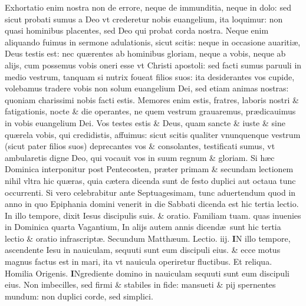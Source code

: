 \documentclass[a5paper,10pt]{book}
\def\rightmarginnote{%
	\lrmarginnote{\hskip\columnwidth \hskip -1em}}
\def\ae{æ}
\begin{document}
\begin{multicols*}{2}
Exhortatio enim nostra non de errore, neque de immunditia, neque in dolo: sed sicut probati sumus a Deo vt crederetur nobis euangelium, ita loquimur: non quasi hominibus placentes, sed Deo qui probat corda nostra.
Neque enim aliquando fuimus in sermone adulationis, sicut scitis: neque in occasione auariti\ae , Deus testis est: nec qu\ae rentes ab hominibus gloriam, neque a vobis, neque ab alijs, cum possemus vobis oneri esse vt Christi apostoli: sed facti sumus paruuli in medio vestrum, tanquam si nutrix foueat filios suos: ita desiderantes vos cupide, volebamus tradere vobis non solum euangelium Dei, sed etiam animas nostras: quoniam charissimi nobis facti estis.
Memores enim estis, fratres, laboris
nostri \& fatigationis, nocte \& die operantes, ne quem vestrum grauaremus, pr\ae dicauimus in vobis euangelium Dei.
Vos testes estis \& Deus, quam sancte \& iuste \& sine qu\ae rela vobis, qui credidistis, affuimus: sicut scitis qualiter vnunquenque vestrum (sicut pater filios suos) deprecantes vos \& consolantes, testificati sumus, vt ambularetis digne Deo, qui vocauit vos in suum regnum \& gloriam.
\newline {} \color{red} Si h\ae c Dominica interponitur post Pentecosten, pr\ae ter primam \& secundam lectionem nihil vltra hic qu\ae ras, quia c\ae tera dicenda sunt de festo duplici aut octaua tunc occurrenti. \color{black}
\newline {} \color{red} Si vero celebrabitur ante Septuagesimam, tunc aduertendum quod in anno in quo Epiphania domini venerit in die Sabbati dicenda est hic tertia lectio. \color{black} In illo tempore, dixit Iesus discipulis suis. \color{red} \& oratio. \color{black} Familiam tuam. \color{red} quas inuenies in Dominica quarta Vagantium, In alijs autem annis dicend\ae \ sunt hic tertia lectio \& oratio infrascript\ae . \color{black}
\newline \color{red} Secundum Matth\ae um. \hfill Lectio. iij. \color{black}
\vspace{-.25em}
\lettrine[lines=2]{\bfseries \color{red} I}{}N\rightmarginnote{ca. 8.} illo tempore, ascendente Iesu in nauiculam, sequuti sunt eum discipuli eius. \& ecce motus magnus factus est in mari, ita vt nauicula operiretur fluctibus.
\color{red} Et reliqua. Homilia Origenis.\color{black}
\vspace{-.25em}
\lettrine[lines=2]{\bfseries \color{red} I}{}Ngrediente domino in nauiculam sequuti sunt eum discipuli eius. Non imbecilles, sed firmi \& stabiles in fide: mansueti \& pij spernentes mundum: non duplici corde, sed simplici.

\end{multicols*}
\end{document}
